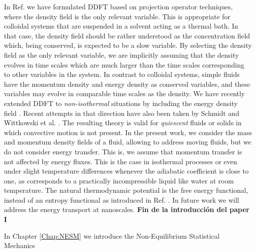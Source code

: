 \documentclass[b5paper,openright,11pt]{book}
\newcommand{\Note}[1]{{\bf \color{red}#1}}    %
\begin{document}
In  Ref.   \cite{Espanol2009d}  we   have  formulated  DDFT  based  on
projection operator  techniques, where the  density field is  the only
relevant variable.  This is appropriate for colloidal systems that are
suspended in  a solvent acting as  a thermal bath.  In  that case, the
density field should  be rather understood as  the concentration field
which,  being  conserved, is  expected  to  be  a slow  variable.   By
selecting  the density  field as  the only  relevant variable,  we are
implicitly assuming that the density  evolves in time scales which are
much larger than  the time scales corresponding to  other variables in
the system.  In contrast to  colloidal systems, simple fluids have the
momentum density and energy density  as conserved variables, and these
variables may  evolve in  comparable time scales  as the  density.  We
have  recently extended  DDFT  to {\em  non-isothermal} situations  by
including the energy density  field \cite{Anero2013}.  Recent attempts
in that direction  have also been taken  by Schmidt \cite{Schmidt2011}
and Wittkowski et al.  \cite{Wittkowski2012}.  The resulting theory is
valid  for \textit{quiescent}  fluids  or solids  in which  convective
motion is not present.  In the  present work, we consider the mass and
momentum density fields of a fluid, allowing to address moving fluids,
but  we do  not  consider energy  transfer. This  is,  we assume  that
momentum transfer is  not affected by energy fluxes. This  is the case
in isothermal  processes or even under  slight temperature differences
whenever the adiabatic coefficient is  close to one, as corresponds to
a practically  incompressible liquid  like water at  room temperature.
The  natural thermodynamic  potential is  the free  energy functional,
instead   of   an   entropy   functional   as   introduced   in   Ref.
\cite{Anero2013}.  In future work we will address the energy transport
at nanoscales.
\Note{Fin de la introducción del paper I}







In Chapter \ref{Chap:NESM} we introduce the Non-Equilibrium Statistical Mechanics
\end{document}

